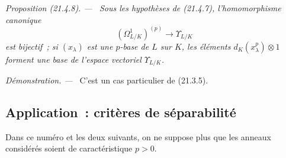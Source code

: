 \documentclass[10pt,oneside]{book}
\makeatletter
\newcommand{\setmanualcurrentlabel}[1]{\def\@currentlabel{#1}}
\newenvironment{proposition}[1][]{%
  \setmanualcurrentlabel{#1}\par\medskip\noindent\itshape Proposition (#1). ---\ }{\par}
\newenvironment{proof}{%
  \par\medskip\noindent\textit{Démonstration. ---\ }}{\par}
\makeatother
\begin{document}
\begin{proposition}[21.4.8]
\label{0.21.4.8-fr}
Sous les hypothèses de (21.4.7), l'homomorphisme canonique
\begin{equation}
\tag{21.4.8.1}\label{0.21.4.8.1-fr}
(\Omega^1_{L/K})^{(p)}\longrightarrow\Upsilon_{L/K}
\end{equation}
est bijectif~; si $(x_\lambda)$ est une $p$-base de $L$ sur $K$, les éléments
$d_K(x_\lambda^p)\otimes1$ forment une base de l'espace vectoriel $\Upsilon_{L/K}$.
\end{proposition}
\begin{proof}
C'est un cas particulier de (21.3.5).
\end{proof}

\subsection{Application~: critères de séparabilité}
\label{0.21.5-fr}

Dans ce numéro et les deux suivants, on ne suppose plus que les anneaux
considérés soient de caractéristique $p>0$.
\end{document}
